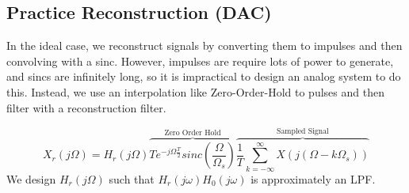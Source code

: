 \documentclass{article}
\begin{document}
\subsection{Practice Reconstruction (DAC)}
In the ideal case, we reconstruct signals by converting them to impulses and then convolving with a sinc.
However, impulses are require lots of power to generate, and sincs are infinitely long, so it is impractical to design an analog system to do this.
Instead, we use an interpolation like Zero-Order-Hold to pulses and then filter with a reconstruction filter.
\begin{figure}[H]
  \centering
\end{figure}
$$X_r(j\Omega) = H_r(j\Omega)\overbrace{Te^{-j\Omega\frac{T}{2}}sinc\left(\frac{\Omega}{\Omega_s}\right)}^{\text{Zero Order Hold}}\overbrace{\frac{1}{T}\sum_{k=-\infty}^{\infty}X(j(\Omega-k\Omega_s))}^{\text{Sampled Signal}}$$
We design $H_r(j\Omega)$ such that $H_r(j\omega)H_0(j\omega)$ is approximately an LPF.
\end{document}
